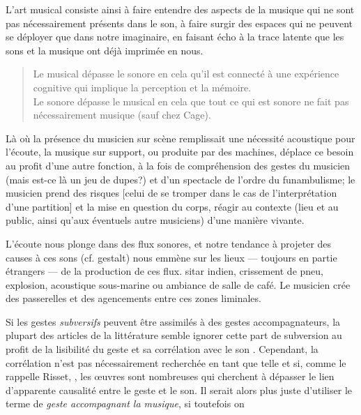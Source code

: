 
L'art musical consiste ainsi à faire entendre des aspects de la musique qui ne sont pas nécessairement présents dans le son, à faire surgir des espaces qui ne peuvent se déployer que dans notre imaginaire, en faisant écho à la trace latente que les sons et la musique ont déjà imprimée en nous.


\begin{quotation}
\noindent Le musical dépasse le sonore en cela qu’il est connecté à une expérience cognitive qui implique la perception et la mémoire.\\
Le sonore dépasse le musical en cela que tout ce qui est sonore ne fait pas nécessairement musique (sauf chez Cage).
\end{quotation}


Là où la présence du musicien sur scène remplissait une nécessité acoustique pour l’écoute, la musique sur support, ou produite par des machines, déplace ce besoin au profit d’une autre fonction, à la fois de compréhension des gestes du musicien (mais est-ce là un jeu de dupes?) et d’un spectacle de l’ordre du funambulisme; le musicien prend des risques [celui de se tromper dans le cas de l’interprétation d’une partition] et la mise en question du corps, réagir au contexte (lieu et au public, ainsi qu’aux éventuels autre musiciens) d’une manière vivante.

L’écoute nous plonge dans des flux sonores, et notre tendance à projeter des causes à ces sons (cf. gestalt) nous emmène sur les lieux — toujours en partie étrangers — de la production de ces flux. sitar indien, crissement de pneu, explosion, acoustique sous-marine ou ambiance de salle de café.
Le musicien crée des passerelles et des agencements entre ces zones liminales.


Si les gestes \textit{subversifs} peuvent être assimilés à des gestes accompagnateurs, la plupart des articles de la littérature semble ignorer cette part de subversion au profit de la lisibilité du geste et sa corrélation avec le son \cite{godoy_exploring_2006}.
Cependant, la corrélation n'est pas nécessairement recherchée en tant que telle et si, comme le rappelle Risset,  \cite{risset_propos_2010}, les œuvres sont nombreuses qui cherchent à dépasser le lien d'apparente causalité entre le geste et le son. 
Il serait alors plus juste d'utiliser le terme de \textit{geste accompagnant la musique}, si toutefois on 

